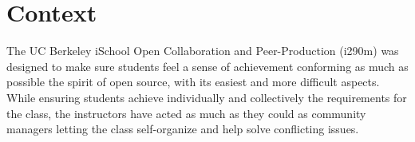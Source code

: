 \section{Context}
The  UC Berkeley iSchool Open Collaboration and Peer-Production (i290m) was designed to make sure students feel a sense of achievement conforming as much as possible the spirit of open source, with its easiest and more difficult aspects. While ensuring students achieve individually and collectively the requirements for the class, the instructors have acted as much as they could as community managers letting the class self-organize and help solve conflicting issues.


%
%

